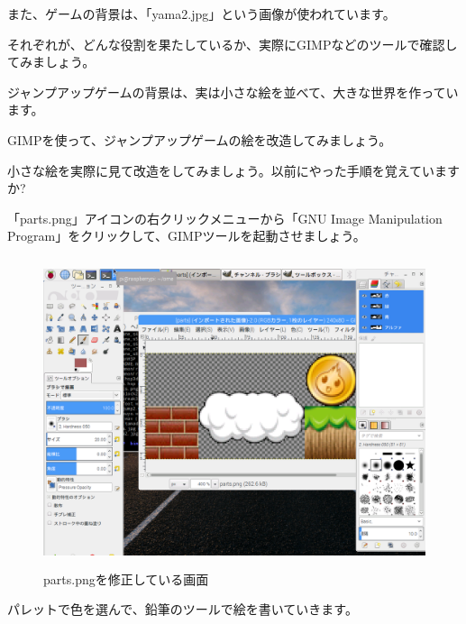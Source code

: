 また、ゲームの背景は、「yama2.jpg」という画像が使われています。

それぞれが、どんな役割を果たしているか、実際にGIMPなどのツールで確認してみましょう。



\begin{description}
    \item {}
\end{description}



ジャンプアップゲームの背景は、実は小さな絵を並べて、大きな世界を作っています。

GIMPを使って、ジャンプアップゲームの絵を改造してみましょう。

小さな絵を実際に見て改造をしてみましょう。以前にやった手順を覚えていますか?

「parts.png」アイコンの右クリックメニューから「GNU Image Manipulation Program」をクリックして、GIMPツールを起動させましょう。


\begin{figure}[H]
    \begin{center}
      \includegraphics[keepaspectratio,width=12.065cm,height=9.049cm]{text04-img/text04-img029.png}
      \caption{parts.pngを修正している画面}
    \end{center}
    \label{fig:prog_menu}
\end{figure}

パレットで色を選んで、鉛筆のツールで絵を書いていきます。


